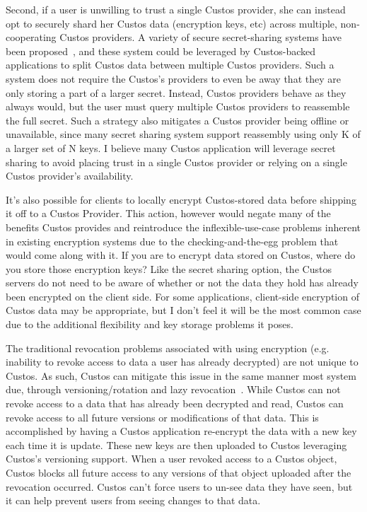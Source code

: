 Second, if a user is unwilling to trust a single Custos provider, she
can instead opt to securely shard her Custos data (encryption keys,
etc) across multiple, non-cooperating Custos providers. A variety of
secure secret-sharing systems have been proposed~\cite{Shamir1979,
  Resch2011, Krawczyk1993}, and these system could be leveraged by
Custos-backed applications to split Custos data between multiple
Custos providers. Such a system does not require the Custos's
providers to even be away that they are only storing a part of a
larger secret. Instead, Custos providers behave as they always would,
but the user must query multiple Custos providers to reassemble the
full secret. Such a strategy also mitigates a Custos provider being
offline or unavailable, since many secret sharing system support
reassembly using only K of a larger set of N keys. I believe many
Custos application will leverage secret sharing to avoid placing trust
in a single Custos provider or relying on a single Custos provider's
availability.

It's also possible for clients to locally encrypt Custos-stored data
before shipping it off to a Custos Provider. This action, however
would negate many of the benefits Custos provides and reintroduce the
inflexible-use-case problems inherent in existing encryption systems
due to the checking-and-the-egg problem that would come along with
it. If you are to encrypt data stored on Custos, where do you store
those encryption keys? Like the secret sharing option, the Custos
servers do not need to be aware of whether or not the data they hold
has already been encrypted on the client side. For some applications,
client-side encryption of Custos data may be appropriate, but I don't
feel it will be the most common case due to the additional flexibility
and key storage problems it poses.

The traditional revocation problems associated with using encryption
(e.g. inability to revoke access to data a user has already decrypted)
are not unique to Custos. As such, Custos can mitigate this issue in
the same manner most system due, through versioning/rotation and lazy
revocation~\cite{Kallahalla2003}. While Custos can not revoke access
to a data that has already been decrypted and read, Custos can revoke
access to all future versions or modifications of that data. This is
accomplished by having a Custos application re-encrypt the data with a
new key each time it is update. These new keys are then uploaded to
Custos leveraging Custos's versioning support. When a user revoked
access to a Custos object, Custos blocks all future access to any
versions of that object uploaded after the revocation occurred. Custos
can't force users to un-see data they have seen, but it can help
prevent users from seeing changes to that data.

